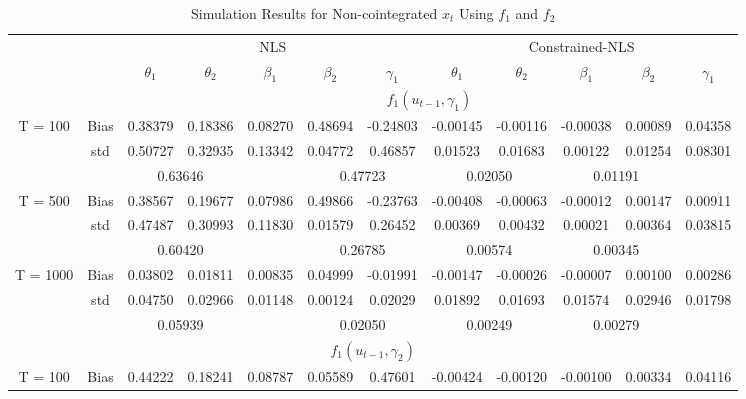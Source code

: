 \documentclass[a4paper,12pt,times,numbered,print,index]{report}
\numberwithin{equation}{section}
\begin{document}
\begin{table}[htbp]
	\centering
	\caption{Simulation Results for Non-cointegrated $x_t$ Using $f_1$ and $f_2$}
	\begin{adjustbox}{max width=\textwidth}
		\begin{tabular}{cccccccccccc}
		\toprule
		&       & \multicolumn{5}{c}{NLS}               & \multicolumn{5}{c}{Constrained-NLS} \\
		&       & $\theta_1$ & $\theta_2$ & $\beta_1$ & $\beta_2$ & $\gamma_1$ & $\theta_1$ & $\theta_2$ & $\beta_1$ & $\beta_2$ & $\gamma_1$ \\
		\midrule
		&       & \multicolumn{10}{c}{$f_1 (u_{t-1}, \gamma_1)$}                \\
		\midrule
		\multirow{3}[1]{*}{T = 100} & Bias  & 0.38379 & 0.18386 & 0.08270 & 0.48694 & -0.24803 & -0.00145 & -0.00116 & -0.00038 & 0.00089 & 0.04358 \\
		& std   & 0.50727 & 0.32935 & 0.13342 & 0.04772 & 0.46857 & 0.01523 & 0.01683 & 0.00122 & 0.01254 & 0.08301 \\
		&       & \multicolumn{2}{c}{0.63646} &       & \multicolumn{2}{c}{0.47723} & \multicolumn{2}{c}{0.02050} & \multicolumn{2}{c}{0.01191} &  \\
		\multirow{3}[0]{*}{T = 500} & Bias  & 0.38567 & 0.19677 & 0.07986 & 0.49866 & -0.23763 & -0.00408 & -0.00063 & -0.00012 & 0.00147 & 0.00911 \\
		& std   & 0.47487 & 0.30993 & 0.11830 & 0.01579 & 0.26452 & 0.00369 & 0.00432 & 0.00021 & 0.00364 & 0.03815 \\
		&       & \multicolumn{2}{c}{0.60420} &       & \multicolumn{2}{c}{0.26785} & \multicolumn{2}{c}{0.00574} & \multicolumn{2}{c}{0.00345} &  \\
		\multirow{3}[1]{*}{T = 1000} & Bias  & 0.03802 & 0.01811 & \textcolor[rgb]{ 0,  .439,  .753}{0.00835} & 0.04999 & -0.01991 & -0.00147 & -0.00026 & \textcolor[rgb]{ 0,  .439,  .753}{-0.00007} & 0.00100 & 0.00286 \\
		& std   & 0.04750 & 0.02966 & \textcolor[rgb]{ 0,  .439,  .753}{0.01148} & 0.00124 & 0.02029 & 0.01892 & 0.01693 & \textcolor[rgb]{ 0,  .439,  .753}{0.01574} & 0.02946 & 0.01798 \\
		&       & \multicolumn{2}{c}{0.05939} &       & \multicolumn{2}{c}{0.02050} & \multicolumn{2}{c}{0.00249} & \multicolumn{2}{c}{0.00279} &  \\
		\midrule
		\multicolumn{12}{c}{$f_1 (u_{t-1}, \gamma_2)$} \\
		\midrule
		\multirow{3}[1]{*}{T = 100} & Bias  & 0.44222 & 0.18241 & 0.08787 & 0.05589 & 0.47601 & -0.00424 & -0.00120 & -0.00100 & 0.00334 & 0.04116 \\

\end{tabular}
\end{adjustbox}
\end{table}
\end{document}
